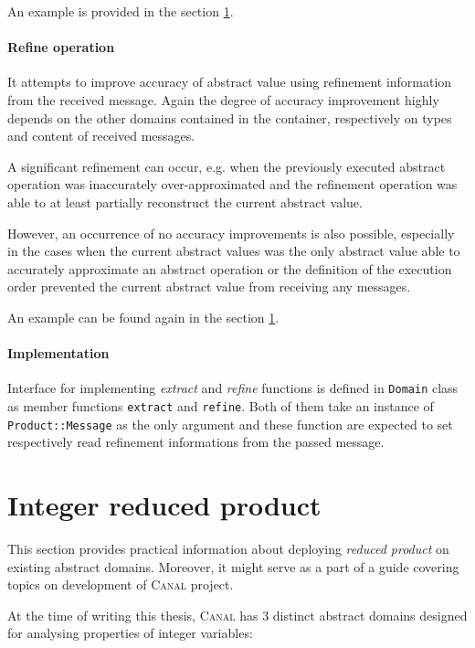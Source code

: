 \documentclass[12pt,oneside]{fithesis2}
\theoremstyle{definition}
\begin{document}
An example is provided in the section \ref{sec:integer-reduced-product}.

\paragraph{Refine operation}
It attempts to improve accuracy of abstract value using refinement information from the received message. Again the degree of accuracy improvement highly depends on the other domains contained in the container, respectively on types and content of received messages.

A significant refinement can occur, e.g. when the previously executed abstract operation was inaccurately over-approximated and the refinement operation was able to at least partially reconstruct the current abstract value.

However, an occurrence of no accuracy improvements is also possible, especially in the cases when the current abstract values was the only abstract value able to accurately approximate an abstract operation or the definition of the execution order prevented the current abstract value from receiving any messages.

An example can be found again in the section \ref{sec:integer-reduced-product}.

\paragraph{Implementation}
Interface for implementing \textit{extract} and \textit{refine} functions is defined in \texttt{Domain} class as member functions \texttt{extract} and \texttt{refine}. Both of them take an instance of \texttt{Product::Message} as the only argument and these function are expected to set respectively read refinement informations from the passed message.

\section{Integer reduced product}\label{sec:integer-reduced-product}

This section provides practical information about deploying \textit{reduced product} on existing abstract domains. Moreover, it might serve as a part of a guide covering topics on development of \textsc{Canal} project.

At the time of writing this thesis, \textsc{Canal} has 3 distinct abstract domains designed for analysing properties of integer variables:
\end{document}
